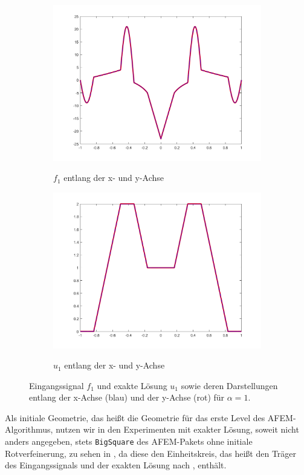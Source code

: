 \begin{figure}[!ht]
  \begin{subfigure}[b]{.48\linewidth}
    \caption{$f_1$ entlang der x- und y-Achse}
    \includegraphics[trim = 50 30 50 20, clip, width=\linewidth]
      {pictures/chapExperiments/secGeneralInfo/f01Plots/inSiAxis.png}
    \label{fig:f01InSiAxis}
  \end{subfigure}
  \quad
  \begin{subfigure}[b]{.48\linewidth}
    \caption{$u_1$ entlang der x- und y-Achse}
    \includegraphics[trim = 50 30 50 20, clip, width=\linewidth]
      {pictures/chapExperiments/secGeneralInfo/f01Plots/exactSolutionAxis.png}
    \label{fig:f01ExactSolAxis}
  \end{subfigure} 
  \caption{Eingangssignal $f_1$ und exakte Lösung $u_1$ sowie deren
  Darstellungen entlang der x-Achse (blau) und der y-Achse (rot) für
  $\alpha=1$.}
  \label{fig:f01Plots}
\end{figure}
Als initiale Geometrie, das heißt die Geometrie für das erste Level des
AFEM-Algorithmus, nutzen wir in den Experimenten mit exakter Lösung,
soweit nicht anders angegeben, stets \texttt{BigSquare} des AFEM-Pakets ohne
initiale Rotverfeinerung, zu sehen in , da diese den
Einheitskreis, das heißt den Träger des Eingangssignals und der exakten Lösung
nach , enthält.

